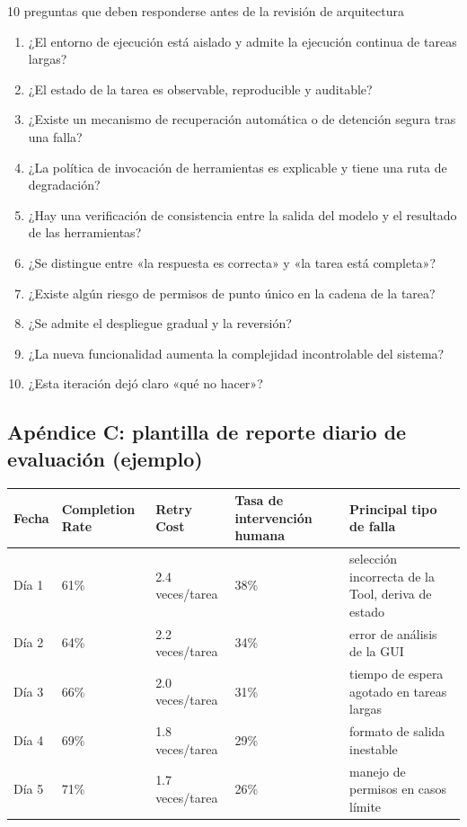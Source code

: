 \begin{importantbox}{10 preguntas que deben responderse antes de la revisión de arquitectura}
\begin{enumerate}
    \item ¿El entorno de ejecución está aislado y admite la ejecución continua de tareas largas?
    \item ¿El estado de la tarea es observable, reproducible y auditable?
    \item ¿Existe un mecanismo de recuperación automática o de detención segura tras una falla?
    \item ¿La política de invocación de herramientas es explicable y tiene una ruta de degradación?
    \item ¿Hay una verificación de consistencia entre la salida del modelo y el resultado de las herramientas?
    \item ¿Se distingue entre «la respuesta es correcta» y «la tarea está completa»?
    \item ¿Existe algún riesgo de permisos de punto único en la cadena de la tarea?
    \item ¿Se admite el despliegue gradual y la reversión?
    \item ¿La nueva funcionalidad aumenta la complejidad incontrolable del sistema?
    \item ¿Esta iteración dejó claro «qué no hacer»?
\end{enumerate}
\end{importantbox}

\subsection{Apéndice C: plantilla de reporte diario de evaluación (ejemplo)}

\begin{center}
\begin{tabular}{p{2.8cm}p{2.5cm}p{2.5cm}p{2.8cm}p{3.5cm}}
\toprule
Fecha & Completion Rate & Retry Cost & Tasa de intervención humana & Principal tipo de falla \\
\midrule
Día 1 & 61\% & 2.4 veces/tarea & 38\% & selección incorrecta de la Tool, deriva de estado \\
Día 2 & 64\% & 2.2 veces/tarea & 34\% & error de análisis de la GUI \\
Día 3 & 66\% & 2.0 veces/tarea & 31\% & tiempo de espera agotado en tareas largas \\
Día 4 & 69\% & 1.8 veces/tarea & 29\% & formato de salida inestable \\
Día 5 & 71\% & 1.7 veces/tarea & 26\% & manejo de permisos en casos límite \\
\bottomrule
\end{tabular}
\end{center}

